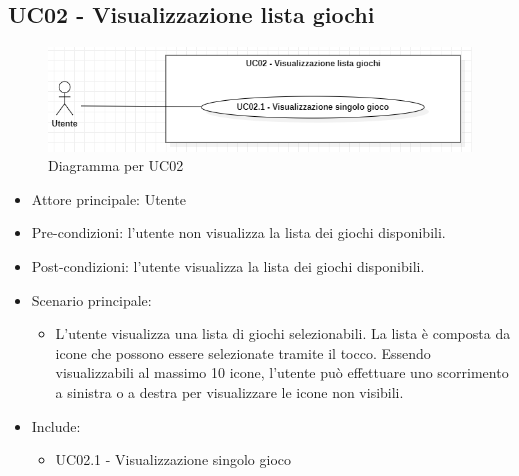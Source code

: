 \subsection{UC02 - Visualizzazione lista giochi}
\begin{figure}[h]
    \centering
    \includegraphics[width=400pt]{images/usecase/UC02.png}
    \caption{Diagramma per UC02}
    \label{fig:UC02}
\end{figure}
\begin{itemize}
    \item Attore principale: Utente
    \item Pre-condizioni: l'utente non visualizza la lista dei giochi disponibili.
    \item Post-condizioni: l'utente visualizza la lista dei giochi disponibili.
    \item Scenario principale: \begin{itemize}
        \item L'utente visualizza una lista di giochi selezionabili. La lista è composta da icone che possono essere selezionate tramite il tocco. Essendo visualizzabili al massimo 10 icone, l'utente può effettuare uno scorrimento a sinistra o a destra per visualizzare le icone non visibili.
    \end{itemize}
    \item Include: \begin{itemize}
        \item UC02.1 - Visualizzazione singolo gioco
    \end{itemize}
\end{itemize}
\newpage
